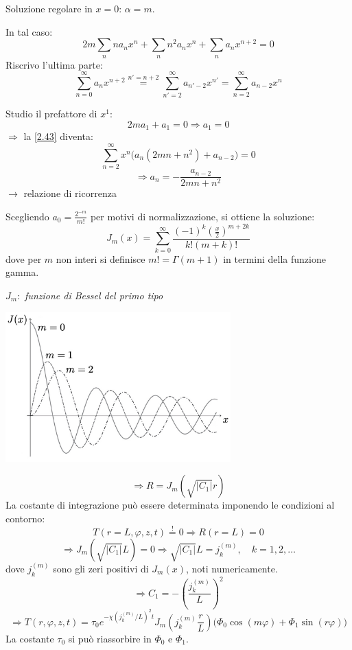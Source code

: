 \documentclass[a4paper,11pt]{report}
\begin{document}
Soluzione regolare in $x=0$: $\alpha=m$. 

In tal caso:
\begin{equation}
2m\sum_n n a_n x^n + \sum_n n^2 a_n x^n + \sum_n a_n x^{n+2}=0
\label{2.43}
\end{equation}
Riscrivo l'ultima parte:
\[
\sum_{n=0}^{\infty} a_{n} x^{n+2}\overset{n'=n+2}{=}\sum_{n'=2}^{\infty} a_{n'-2} x^{n'}=\sum_{n=2}^{\infty} a_{n-2} x^{n}
\]

Studio il prefattore di $x^1$:
\[
2ma_1+a_1=0 \Rightarrow a_1=0 
\]
$\Rightarrow$ la \eqref{2.43} diventa:
\[
\sum_{n=2}^{\infty}x^n\big(a_n(2mn+n^2)+a_{n-2}\big)=0 
\]
\begin{equation}
\Rightarrow a_n = - \frac{a_{n-2}}{2mn+n^2}
\end{equation}
$\rightarrow$ relazione di ricorrenza

Scegliendo $a_0=\frac{2^{-m}}{m!}$ per motivi di normalizzazione, si ottiene la soluzione:
\begin{equation}
J_m(x)=\sum_{k=0}^{\infty}\frac{(-1)^k\left(\frac{x}{2}\right)^{m+2k}}{k!(m+k)!}
\end{equation}
dove per $m$ non interi si definisce $m!=\Gamma(m+1)$ in termini della funzione gamma.

$J_m:$ \emph{funzione di Bessel del primo tipo}

\begin{center}
\includegraphics[width=0.65\textwidth]{immagini/bessel}
\end{center}
\[
\Rightarrow R=J_m(\sqrt{|C_1|}r)
\]
La costante di integrazione pu\`o essere determinata imponendo le condizioni al contorno:
\[
T(r=L,\varphi,z,t)\overset{!}{=}0 \Rightarrow R(r=L)=0
\]
\[
\Rightarrow J_m(\sqrt{|C_1|}L)=0 \Rightarrow \sqrt{|C_1|}L=j_k^{(m)}, \quad k=1,2,\dots
\]
dove $j_k^{(m)}$ sono gli zeri positivi di $J_m(x)$, noti numericamente.
\[
\Rightarrow C_1=-\left(\frac{j_k^{(m)}}{L}\right)^2
\]
\[
\Rightarrow T(r,\varphi,z,t)=\tau_0e^{-\chi \left(j_k^{(m)}/L\right)^2 t} J_m\left(j_k^{(m)}\frac{r}{L}\right)\big(\Phi_0\cos(m\varphi) + \Phi_1 \sin( r\varphi)\big)
\]
La costante $\tau_0$ si pu\`o riassorbire in $\Phi_0$ e $\Phi_1$.
\end{document}
